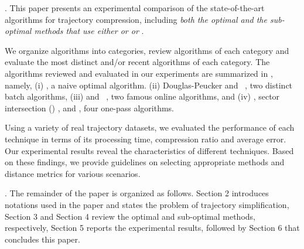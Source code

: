 \stitle{\textcolor{blue}{Contributions}}.
This paper presents an experimental comparison of the state-of-the-art \lsa algorithms for trajectory compression, including \emph{both the optimal and the sub-optimal methods that use either \ped or \sed or \dad}.

We organize \lsa algorithms into categories, %
review algorithms of each category and evaluate the most distinct and/or recent algorithms of each category.
The algorithms reviewed and evaluated in our experiments are summarized in , namely,
(i) \opt\cite{Chan:Optimal, Imai:Optimal}, a naive optimal \lsa algorithm.
(ii) Douglas-Peucker\cite{Douglas:Peucker,Meratnia:Spatiotemporal} and \pavlidis~\cite{Pavlidis:Segment}, two distinct batch \lsa algorithms,
(iii) \bqsa\cite{Liu:BQS} and \squishe~\cite{Muckell:SQUISH}, two famous online \lsa algorithms, and
(iv) \operb\cite{Lin:Operb}, sector intersection (\siped) \cite{Williams:Longest,Sklansky:Cone,Dunham:Cone, Zhao:Sleeve}, \cised \cite{Lin:Cised} and \interval\cite{Ke:Interval}, four one-pass \lsa algorithms.

%
%
Using a variety of real trajectory datasets, we evaluated the performance of each technique in terms of its processing time, compression ratio and average error.
Our experimental results reveal the characteristics of different techniques.
%
Based on these findings, we provide guidelines on selecting appropriate methods and distance metrics for various scenarios.

.
The remainder of the paper is organized as follows.
Section 2 introduces notations used in the paper and states the problem of trajectory simplification,
Section 3 and Section 4 review the optimal and sub-optimal \lsa methods, respectively,
Section 5 reports the experimental results, followed by
Section 6 that concludes this paper.



